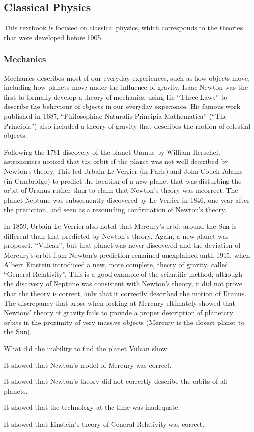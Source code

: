 \subsection{Classical Physics}
This textbook is focused on classical physics, which corresponds to the theories that were developed before 1905.
\subsubsection{Mechanics}
Mechanics describes most of our everyday experiences, such as how objects move, including how planets move under the influence of gravity. Isaac Newton was the first to formally develop a theory of mechanics, using his ``Three Laws'' to describe the behaviour of objects in our everyday experience. His famous work published in 1687, ``Philosophiae Naturalis Principia Mathematica'' (``The Principia'') also included a theory of gravity that describes the motion of celestial objects. 

Following the 1781 discovery of the planet Uranus by William Herschel, astronomers noticed that the orbit of the planet was not well described by Newton's theory. This led Urbain Le Verrier (in Paris) and John Couch Adams (in Cambridge) to predict the location of a new planet that was disturbing the orbit of Uranus rather than to claim that Newton's theory was incorrect. The planet Neptune was subsequently discovered by Le Verrier in 1846, one year after the prediction, and seen as a resounding confirmation of Newton's theory. 

In 1859, Urbain Le Verrier also noted that Mercury's orbit around the Sun is different than that predicted by Newton's theory. Again, a new planet was proposed, ``Vulcan'', but that planet was never discovered and the deviation of Mercury's orbit from Newton's prediction remained unexplained until 1915, when Albert Einstein introduced a new, more complete, theory of gravity, called ``General Relativity''. This is a good example of the scientific method; although the discovery of Neptune was consistent with Newton's theory, it did not prove that the theory is correct, only that it correctly described the motion of Uranus. The discrepancy that arose when looking at Mercury ultimately showed that Newtons' theory of gravity fails to provide a proper description of planetary orbits in the proximity of very massive objects (Mercury is the closest planet to the Sun). 

\begin{checkpoint}
\begin{MCquestion}{What did the inability to find the planet Vulcan show:}
\item It showed that Newton's model of Mercury was correct. 
\item It showed that Newton's theory did not correctly describe the orbits of all planets.\correct
\item It showed that the technology at the time was inadequate. 
\item It showed that Einstein's theory of General Relativity was correct. 
\end{MCquestion}
\end{checkpoint}
 


